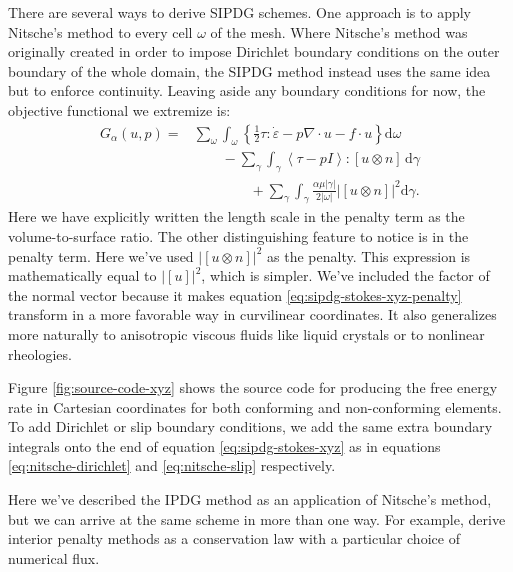 \documentclass[gmd, manuscript]{copernicus}
\begin{document}
There are several ways to derive SIPDG schemes.
One approach is to apply Nitsche's method to every cell $\omega$ of the mesh.
Where Nitsche's method was originally created in order to impose Dirichlet boundary conditions on the outer boundary of the whole domain, the SIPDG method instead uses the same idea but to enforce continuity.
Leaving aside any boundary conditions for now, the objective functional we extremize is:
\begin{subequations}
    \label{eq:sipdg-stokes-xyz}
    \begin{align}
        G_\alpha(u, p) = & \sum_\omega\int_\omega\left\{\frac{1}{2}\tau:\dot\varepsilon - p\nabla\cdot u - f\cdot u\right\}\mathrm d\omega \label{eq:sipdg-stokes-xyz-cells} \\
        & \qquad - \sum_\gamma\int_\gamma \left\langle\tau - pI \right\rangle: [u\otimes n]\,\mathrm d\gamma \label{eq:sipdg-stokes-xyz-flux} \\
        & \qquad\qquad + \sum_\gamma\int_\gamma\frac{\alpha\mu|\gamma|}{2|\omega|}|[u\otimes n]|^2\mathrm d\gamma. \label{eq:sipdg-stokes-xyz-penalty}
    \end{align}
\end{subequations}
Here we have explicitly written the length scale in the penalty term as the volume-to-surface ratio.
The other distinguishing feature to notice is in the penalty term.
Here we've used $|[u\otimes n]|^2$ as the penalty.
This expression is mathematically equal to $|[u]|^2$, which is simpler.
We've included the factor of the normal vector because it makes equation \eqref{eq:sipdg-stokes-xyz-penalty} transform in a more favorable way in curvilinear coordinates.
It also generalizes more naturally to anisotropic viscous fluids like liquid crystals or to nonlinear rheologies.

Figure \ref{fig:source-code-xyz} shows the source code for producing the free energy rate in Cartesian coordinates for both conforming and non-conforming elements.
To add Dirichlet or slip boundary conditions, we add the same extra boundary integrals onto the end of equation \eqref{eq:sipdg-stokes-xyz} as in equations \eqref{eq:nitsche-dirichlet} and \eqref{eq:nitsche-slip} respectively.

Here we've described the IPDG method as an application of Nitsche's method, but we can arrive at the same scheme in more than one way.
For example, \citet{cockburn2002local} derive interior penalty methods as a conservation law with a particular choice of numerical flux.
\end{document}
